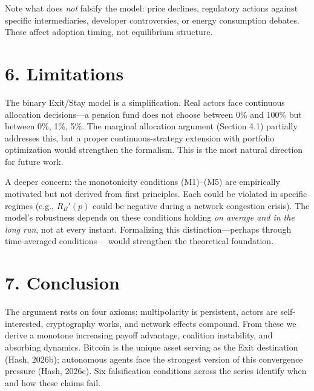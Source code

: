 \documentclass[12pt]{article}
\theoremstyle{definition}
\theoremstyle{remark}
\begin{document}
Note what does \emph{not} falsify the model: price declines, regulatory
actions against specific intermediaries, developer controversies, or
energy consumption debates. These affect adoption timing, not
equilibrium structure.


\section{6. Limitations}

The binary Exit/Stay model is a simplification. Real actors face
continuous allocation decisions---a pension fund does not choose between
0\% and 100\% but between 0\%, 1\%, 5\%. The marginal allocation
argument (Section 4.1) partially addresses this, but a proper
continuous-strategy extension with portfolio optimization would
strengthen the formalism. This is the most natural direction for future
work.

A deeper concern: the monotonicity conditions (M1)--(M5) are empirically
motivated but not derived from first principles. Each could be violated
in specific regimes (e.g., $R_B'(p)$ could be negative during a network
congestion crisis). The model's robustness depends on these conditions
holding \emph{on average and in the long run}, not at every instant.
Formalizing this distinction---perhaps through time-averaged conditions---
would strengthen the theoretical foundation.


\section{7. Conclusion}

The argument rests on four axioms: multipolarity is persistent, actors
are self-interested, cryptography works, and network effects compound.
From these we derive a monotone increasing payoff advantage, coalition
instability, and absorbing dynamics. Bitcoin is the unique asset serving
as the Exit destination (Hash, 2026b); autonomous agents face the
strongest version of this convergence pressure (Hash, 2026c). Six
falsification conditions across the series identify when and how these
claims fail.

\end{document}
